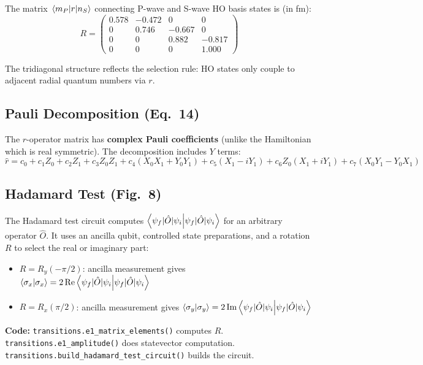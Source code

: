\documentclass[11pt,a4paper]{article}
\begin{document}
The matrix $\mel{m_P}{r}{n_S}$ connecting P-wave and S-wave HO basis states is (in fm):
\begin{equation}
  R = \begin{pmatrix}
    0.578 & -0.472 & 0 & 0 \\
    0 & 0.746 & -0.667 & 0 \\
    0 & 0 & 0.882 & -0.817 \\
    0 & 0 & 0 & 1.000
  \end{pmatrix}
\end{equation}

The tridiagonal structure reflects the selection rule: HO states only couple to adjacent radial quantum numbers via $r$.

\subsection{Pauli Decomposition (Eq.~14)}

The $r$-operator matrix has \textbf{complex Pauli coefficients} (unlike the Hamiltonian which is real symmetric). The decomposition includes $Y$ terms:
\begin{equation}
  \hat{r} = c_0 + c_1 Z_0 + c_2 Z_1 + c_3 Z_0 Z_1 + c_4(X_0 X_1 + Y_0 Y_1)
    + c_5(X_1 - iY_1) + c_6 Z_0(X_1 + iY_1) + c_7(X_0 Y_1 - Y_0 X_1)
\end{equation}

\subsection{Hadamard Test (Fig.~8)}

The Hadamard test circuit computes $\braket{\psi_f|\hat{O}|\psi_i}$ for an arbitrary operator $\hat{O}$. It uses an ancilla qubit, controlled state preparations, and a rotation $R$ to select the real or imaginary part:
\begin{itemize}[nosep]
  \item $R = R_y(-\pi/2)$: ancilla measurement gives $\braket{\sigma_x} = 2\,\text{Re}\braket{\psi_f|\hat{O}|\psi_i}$
  \item $R = R_x(\pi/2)$: ancilla measurement gives $\braket{\sigma_y} = 2\,\text{Im}\braket{\psi_f|\hat{O}|\psi_i}$
\end{itemize}

\vspace{0.3em}
\noindent\textbf{Code:} \texttt{transitions.e1\_matrix\_elements()} computes $R$. \texttt{transitions.e1\_amplitude()} does statevector computation. \texttt{transitions.build\_hadamard\_test\_circuit()} builds the circuit.
\end{document}
